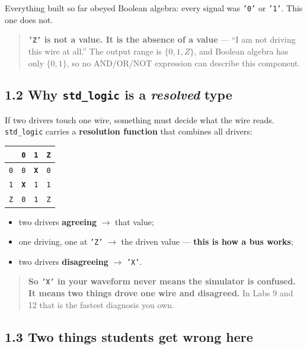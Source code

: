 \documentclass[11pt]{article}
\newcommand{\code}[1]{\texttt{#1}}
\begin{document}
Everything built so far obeyed Boolean algebra: every signal was \code{'0'} or
\code{'1'}. This one does not.

\begin{quote}
\textbf{\code{'Z'} is not a value. It is the absence of a value} --- ``I am not
driving this wire at all.'' The output range is $\{0,1,Z\}$, and Boolean algebra
has only $\{0,1\}$, so no AND/OR/NOT expression can describe this component.
\end{quote}

\subsection*{1.2 Why \code{std\_logic} is a \emph{resolved} type}

If two drivers touch one wire, something must decide what the wire reads.
\code{std\_logic} carries a \textbf{resolution function} that combines all
drivers:

\begin{center}
\begin{tabular}{c||ccc}
\toprule
& \code{0} & \code{1} & \code{Z} \\
\midrule
\code{0} & \code{0} & \textbf{\code{X}} & \code{0} \\
\code{1} & \textbf{\code{X}} & \code{1} & \code{1} \\
\code{Z} & \code{0} & \code{1} & \code{Z} \\
\bottomrule
\end{tabular}
\end{center}

\begin{itemize}[leftmargin=1.6em,itemsep=1pt]
\item two drivers \textbf{agreeing} $\rightarrow$ that value;
\item one driving, one at \code{'Z'} $\rightarrow$ the driven value ---
\textbf{this is how a bus works};
\item two drivers \textbf{disagreeing} $\rightarrow$ \code{'X'}.
\end{itemize}

\begin{quote}
\textbf{So \code{'X'} in your waveform never means the simulator is confused. It
means two things drove one wire and disagreed.} In Labs 9 and 12 that is the
fastest diagnosis you own.
\end{quote}

\subsection*{1.3 Two things students get wrong here}
\end{document}

